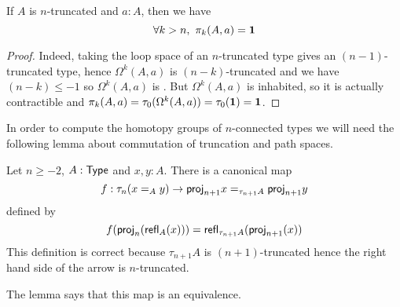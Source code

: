 \begin{lem}
  If $A$ is $n$-truncated and $a:A$, then we have
  \[\forall k>n,\ \pi_k(A,a)=\unit\]
\end{lem}

\begin{proof}
  Indeed, taking the loop space of an $n$-truncated type gives an
  $(n-1)$-truncated type, hence $\Omega^k(A,a)$ is $(n-k)$-truncated and we have
  $(n-k)\le-1$ so $\Omega^k(A,a)$ is \anhprop. But $\Omega^k(A,a)$ is inhabited,
  so it is actually contractible and
  $\pi_k(A,a)=\tau_0(\Omega^k(A,a))=\tau_0(\mathbf{1})=\mathbf{1}$.
\end{proof}

In order to compute the homotopy groups of $n$-connected types we will need the
following lemma about commutation of truncation and path spaces.

\begin{lem}
  Let $n\ge-2$, $A:\mathsf{Type}$ and $x,y:A$. There is a canonical map
  \[f:\tau_n(x=_Ay)\to\mathsf{proj}_{n+1}x=_{\tau_{n+1}A}\mathsf{proj}_{n+1}y\]
  defined by
  \[f(\mathsf{proj}_n(\mathsf{refl}_{A}(x)))=\mathsf{refl}_{\tau_{n+1}A}(\mathsf{proj}_{n+1}(x))\]
  This definition is correct because $\tau_{n+1}A$ is $(n+1)$-truncated hence
  the right hand side of the arrow is $n$-truncated.

  The lemma says that this map is an equivalence.
\end{lem}

